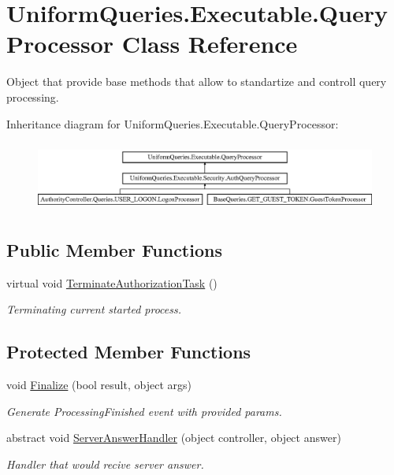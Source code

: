 \hypertarget{class_uniform_queries_1_1_executable_1_1_query_processor}{}\section{Uniform\+Queries.\+Executable.\+Query\+Processor Class Reference}
\label{class_uniform_queries_1_1_executable_1_1_query_processor}


Object that provide base methods that allow to standartize and controll query processing.  


Inheritance diagram for Uniform\+Queries.\+Executable.\+Query\+Processor\+:\begin{figure}[H]
\begin{center}
\leavevmode
\includegraphics[height=2.326870cm]{dc/d75/class_uniform_queries_1_1_executable_1_1_query_processor}
\end{center}
\end{figure}
\subsection*{Public Member Functions}
\begin{DoxyCompactItemize}
\item 
virtual void \mbox{\hyperlink{class_uniform_queries_1_1_executable_1_1_query_processor_a7cbb30cf1452ec10f246d82145f0d90f}{Terminate\+Authorization\+Task}} ()
\begin{DoxyCompactList}\small\item\em Terminating current started process. \end{DoxyCompactList}\end{DoxyCompactItemize}
\subsection*{Protected Member Functions}
\begin{DoxyCompactItemize}
\item 
void \mbox{\hyperlink{class_uniform_queries_1_1_executable_1_1_query_processor_abe2a2292006829ba3b715b1cfe19f9cb}{Finalize}} (bool result, object args)
\begin{DoxyCompactList}\small\item\em Generate Processing\+Finished event with provided params. \end{DoxyCompactList}\item 
abstract void \mbox{\hyperlink{class_uniform_queries_1_1_executable_1_1_query_processor_a4597c1035fc6bb96f9285cb666655a53}{Server\+Answer\+Handler}} (object controller, object answer)
\begin{DoxyCompactList}\small\item\em Handler that would recive server answer. \end{DoxyCompactList}\end{DoxyCompactItemize}
